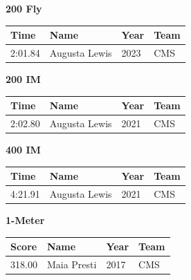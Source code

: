 \vspace{1.2em}
\noindent\begin{minipage}[t]{0.98\textwidth}
\centering
\textbf{\textcolor{teamprimary}{200 Fly}}\par
\vspace{0.5em}
\centering
\small
\renewcommand{\arraystretch}{1.0}
\setlength{\tabcolsep}{4pt}
\begin{tabular}{@{}p{2.5cm}p{4.5cm}p{1.5cm}p{2.5cm}@{}}
\toprule
\textbf{Time} & \textbf{Name} & \textbf{Year} & \textbf{Team} \\
\midrule
2:01.84 & Augusta Lewis & 2023 & CMS \\
\bottomrule
\end{tabular}
\end{minipage}
\vspace{1.2em}
\noindent\begin{minipage}[t]{0.98\textwidth}
\centering
\textbf{\textcolor{teamprimary}{200 IM}}\par
\vspace{0.5em}
\centering
\small
\renewcommand{\arraystretch}{1.0}
\setlength{\tabcolsep}{4pt}
\begin{tabular}{@{}p{2.5cm}p{4.5cm}p{1.5cm}p{2.5cm}@{}}
\toprule
\textbf{Time} & \textbf{Name} & \textbf{Year} & \textbf{Team} \\
\midrule
2:02.80 & Augusta Lewis & 2021 & CMS \\
\bottomrule
\end{tabular}
\end{minipage}
\vspace{1.2em}
\noindent\begin{minipage}[t]{0.98\textwidth}
\centering
\textbf{\textcolor{teamprimary}{400 IM}}\par
\vspace{0.5em}
\centering
\small
\renewcommand{\arraystretch}{1.0}
\setlength{\tabcolsep}{4pt}
\begin{tabular}{@{}p{2.5cm}p{4.5cm}p{1.5cm}p{2.5cm}@{}}
\toprule
\textbf{Time} & \textbf{Name} & \textbf{Year} & \textbf{Team} \\
\midrule
4:21.91 & Augusta Lewis & 2021 & CMS \\
\bottomrule
\end{tabular}
\end{minipage}
\vspace{1.2em}
\noindent\begin{minipage}[t]{0.98\textwidth}
\centering
\textbf{\textcolor{teamprimary}{1-Meter}}\par
\vspace{0.5em}
\centering
\small
\renewcommand{\arraystretch}{1.0}
\setlength{\tabcolsep}{4pt}
\begin{tabular}{@{}p{2.5cm}p{4.5cm}p{1.5cm}p{2.5cm}@{}}
\toprule
\textbf{Score} & \textbf{Name} & \textbf{Year} & \textbf{Team} \\
\midrule
318.00 & Maia Presti & 2017 & CMS \\
\bottomrule
\end{tabular}
\end{minipage}
